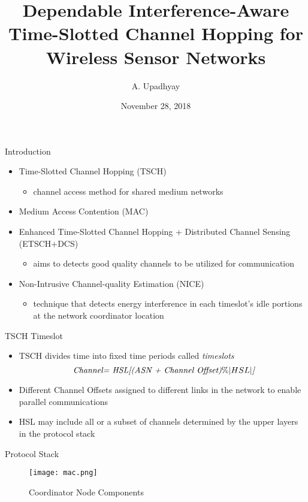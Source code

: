 \documentclass[t]{beamer}
\title{
  Dependable Interference-Aware Time-Slotted Channel Hopping for Wireless Sensor Networks
}
\author{A. Upadhyay}
\institute{
  Computer Science Department\\
  Jack Baskin School of Engineering\\
  University of California Santa Cruz
}
\date{November 28, 2018}
\begin{document}
\begin{frame}
\titlepage
\end{frame}

\begin{frame}{Introduction}
\begin{itemize}
  \item Time-Slotted Channel Hopping (TSCH)
   \begin{itemize}
    \item channel access method for shared medium networks 
  \end{itemize}
    \item Medium Access Contention (MAC)
   \begin{itemize}
  \end{itemize}
  \item Enhanced Time-Slotted Channel Hopping + Distributed Channel Sensing (ETSCH+DCS)  
   \begin{itemize}
    \item aims to detects good quality channels to be utilized for communication 
  \end{itemize}
  \item Non-Intrusive Channel-quality Estimation (NICE)
     \begin{itemize}
    \item technique that detects energy interference in each timeslot's idle portions at the network coordinator location 
  \end{itemize}
\end{itemize}
\end{frame}

\begin{frame}{TSCH Timeslot}
\begin{itemize}
  \item TSCH divides time into fixed time periods called \emph{timeslots}
  \begin{equation}
\centerline{\emph{Channel= HSL[(ASN + Channel Offset)$  \%|HSL|$]}}
\end{equation}
  \item Different Channel Offsets assigned to different
links in the network to enable parallel communications \cite{wireless}
  \item HSL may include all or a subset of channels determined by the upper layers in the protocol stack
\end{itemize}
\end{frame}
\begin{frame}{Protocol Stack}
\begin{figure}[htp]
\centering
\vspace{-4mm}
\texttt{[image: mac.png]}
\caption{Coordinator Node Components}
\label{fig:lion}
\end{figure}

\end{frame}
\end{document}
